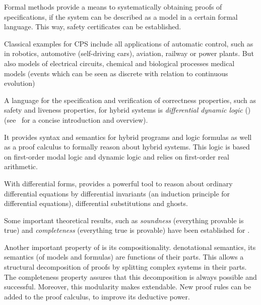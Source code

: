     Formal methods provide a means to systematically obtaining proofs of specifications, if the system can be described as a model in a certain formal language.
    This way, safety certificates can be established.

    

    
    Classical examples for CPS include all applications of automatic control, such as in robotics, automotive (self-driving cars), aviation, railway or power plants.
    But also models of electrical circuits, chemical and biological processes
    medical models
    (events which can be seen as discrete with relation to continuous evolution)


    A language for the specification and verification of correctness properties, such as safety and liveness properties,
    for hybrid systems is \emph{differential dynamic logic} (\dL)
    (see~\cite{Platzer12LogicsDynSys} for a concise introduction and overview).

    It provides syntax and semantics for hybrid programs and logic formulas as well as a proof calculus to formally reason about hybrid systems.
    This logic is based on first-order modal logic and dynamic logic and relies on first-order real arithmetic.

    
    With differential forms, \dL provides a powerful tool to reason about ordinary differential equations by differential invariants (an induction principle for differential equations), differential substitutions and ghosts.    

    Some important theoretical results, such as \emph{soundness} (everything provable is true) and \emph{completeness} (everything true is provable) have been established for \dL.

    Another important property of \dL is its compositionality.
    denotational semantics, its semantics (of models and formulas) are functions of their parts.
    This allows a structural decomposition of proofs by splitting complex systems in their parts.
    The completeness property assures that this decomposition is always possible and successful.
    Moreover, this modularity makes \dL extendable. New proof rules can be added to the proof calculus, to improve its deductive power.

